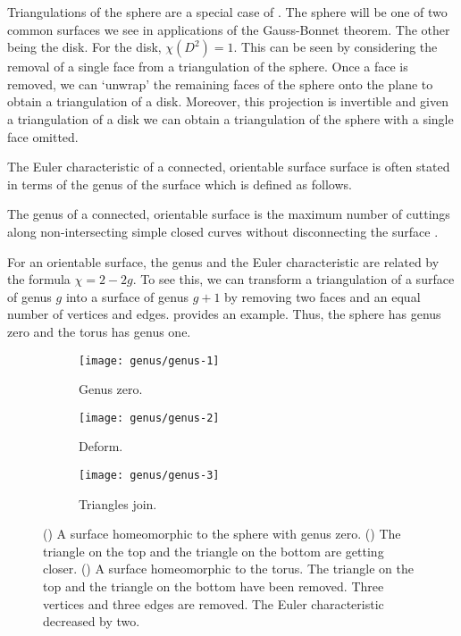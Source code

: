Triangulations of the sphere are a special case of .
The sphere will be one of two common surfaces we see in applications
of the Gauss-Bonnet theorem. The other being the disk.
For the disk, $\chi(D^2)=1$. This can be seen by considering
the removal of a single face from a triangulation of the sphere.
Once a face is removed, we can `unwrap' the remaining faces of the sphere
onto the plane to obtain a triangulation of a disk. Moreover, this projection
is invertible and given a triangulation of a disk we can obtain a triangulation
of the sphere with a single face omitted.

The Euler characteristic of a connected, orientable surface surface is often 
stated in terms of the genus of the surface which is defined as follows.
\begin{definition}\label{def:genus}
	The genus of a connected, orientable surface is the maximum number of
	cuttings along non-intersecting simple closed curves without disconnecting
	the surface \cite{munkres}.
\end{definition}


For an orientable surface, the genus and the Euler characteristic are related by
the formula $\chi=2-2g$. To see this, we can transform a triangulation of a surface of
genus $g$ into a surface of genus $g+1$ by removing two faces and an equal number
of vertices and edges.  provides an example.
Thus, the sphere has genus zero and the torus has genus one.


\begin{figure}[htb]
        \centering
        \begin{subfigure}[b]{0.2\textwidth}
        \texttt{[image: genus/genus-1]}
        \caption{Genus zero.}
          \label{fig:initial-sphere}
        \end{subfigure}
          \hspace{.5cm}
         \begin{subfigure}[b]{0.2\textwidth}
        \texttt{[image: genus/genus-2]}
        \caption{Deform.}
        \label{fig:decending-faces}
        \end{subfigure}
          \hspace{.5cm}
         \begin{subfigure}[b]{0.2\textwidth}
        \texttt{[image: genus/genus-3]}
        \caption{Triangles join.}
        \label{fig:faces-join}
        \end{subfigure}
		\caption{() A surface homeomorphic to the sphere with genus zero.
		() The triangle on the top and the triangle on the bottom are getting
		closer. ()  A surface homeomorphic to the torus. The triangle on the top
		and the triangle on the bottom have been removed. Three vertices and three edges are				removed. The Euler characteristic decreased by two.
		\label{fig:genus}}
\end{figure}

